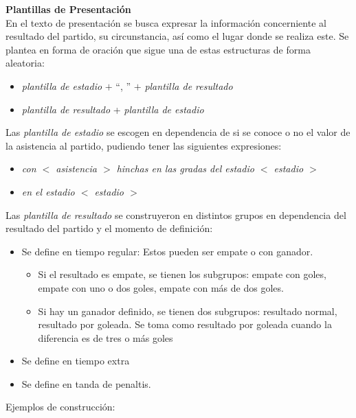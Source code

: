     \textbf{Plantillas de Presentación}\\

    En el texto de presentación se busca expresar la información concerniente al resultado del partido, su circunstancia, así como el lugar donde se 
realiza este. Se plantea en forma de oración que sigue una de estas estructuras de forma aleatoria:
    \begin{itemize}
        \item \textit{plantilla de estadio} $+$ “, ” $+$ \textit{plantilla de resultado}
        \item \textit{plantilla de resultado} + \textit{plantilla de estadio}
    \end{itemize}
        
Las \textit{plantilla de estadio} se escogen en dependencia de si se conoce o no el valor de la asistencia al partido, pudiendo tener las siguientes expresiones:
    \begin{itemize}
        \item \textit{con  $<$ asistencia $>$ hinchas en las gradas del estadio $<$ estadio $>$}
        \item \textit{en el estadio $<$ estadio $>$}
    \end{itemize}

Las \textit{plantilla de resultado} se construyeron en distintos grupos en dependencia del resultado del partido y el momento de definición:
    \begin{itemize}
        \item Se define en tiempo regular: Estos pueden ser empate o con ganador. 
                    \begin{itemize}
                        \item Si el resultado es empate, se tienen los subgrupos: empate con goles, 
                        empate con uno o dos goles, empate con más de dos goles. 
                        \item  Si hay un ganador definido, se tienen dos subgrupos: resultado normal, 
                        resultado por goleada. Se toma como resultado por goleada cuando la diferencia es de tres o más goles
                    \end{itemize}
        \item Se define en tiempo extra
        \item Se define en tanda de penaltis.
    \end{itemize}

    Ejemplos de construcción:\\

